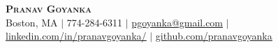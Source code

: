 
\begin{center}
  \textbf{\Huge \scshape Pranav Goyanka} \\ \vspace{1pt}
  \small Boston, MA $|$
  \small 774-284-6311 $|$ \href{mailto:pgoyanka@gmail.com}{\underline{pgoyanka@gmail.com}} $|$ 
  \href{https://www.linkedin.com/in/pranavgoyanka/}{\underline{linkedin.com/in/pranavgoyanka/}} $|$
  \href{https://github.com/pranavgoyanka/}{\underline{github.com/pranavgoyanka}}
\end{center}